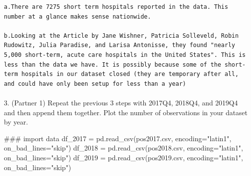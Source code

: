 \documentclass[
  letterpaper,
  DIV=11,
  numbers=noendperiod]{scrartcl}
\makeatletter
\let\oldparagraph\paragraph
\renewcommand{\paragraph}{
    \@ifstar
      \xxxParagraphStar
      \xxxParagraphNoStar
  }
\newcommand{\xxxParagraphStar}[1]{\oldparagraph*{#1}\mbox{}}
\newcommand{\xxxParagraphNoStar}[1]{\oldparagraph{#1}\mbox{}}
\newenvironment{Shaded}{\begin{snugshade}}{\end{snugshade}}
\newcommand{\CommentTok}[1]{\textcolor[rgb]{0.37,0.37,0.37}{#1}}
\newcommand{\NormalTok}[1]{\textcolor[rgb]{0.00,0.23,0.31}{#1}}
\newcommand{\OperatorTok}[1]{\textcolor[rgb]{0.37,0.37,0.37}{#1}}
\newcommand{\StringTok}[1]{\textcolor[rgb]{0.13,0.47,0.30}{#1}}
\makeatother
\begin{document}
\begin{verbatim}
a.There are 7275 short term hospitals reported in the data. This number at a glance makes sense nationwide.

b.Looking at the Article by Jane Wishner, Patricia Solleveld, Robin Rudowitz, Julia Paradise, and Larisa Antonisse, they found "nearly 5,000 short-term, acute care hospitals in the United States". This is less than the data we have. It is possibly because some of the short-term hospitals in our dataset closed (they are temporary after all, and could have only been setup for less than a year)
\end{verbatim}

\paragraph{3. (Partner 1) Repeat the previous 3 steps with 2017Q4,
2018Q4, and 2019Q4 and then append them together. Plot the number of
observations in your dataset by
year.}\label{partner-1-repeat-the-previous-3-steps-with-2017q4-2018q4-and-2019q4-and-then-append-them-together.-plot-the-number-of-observations-in-your-dataset-by-year.}

\begin{Shaded}
\begin{Highlighting}[]
\CommentTok{\#\#\# import data }
\NormalTok{df\_2017 }\OperatorTok{=}\NormalTok{ pd.read\_csv(}\StringTok{\textquotesingle{}pos2017.csv\textquotesingle{}}\NormalTok{, encoding}\OperatorTok{=}\StringTok{"latin1"}\NormalTok{, on\_bad\_lines}\OperatorTok{=}\StringTok{"skip"}\NormalTok{)}
\NormalTok{df\_2018 }\OperatorTok{=}\NormalTok{ pd.read\_csv(}\StringTok{\textquotesingle{}pos2018.csv\textquotesingle{}}\NormalTok{, encoding}\OperatorTok{=}\StringTok{"latin1"}\NormalTok{, on\_bad\_lines}\OperatorTok{=}\StringTok{"skip"}\NormalTok{)}
\NormalTok{df\_2019 }\OperatorTok{=}\NormalTok{ pd.read\_csv(}\StringTok{\textquotesingle{}pos2019.csv\textquotesingle{}}\NormalTok{, encoding}\OperatorTok{=}\StringTok{"latin1"}\NormalTok{, on\_bad\_lines}\OperatorTok{=}\StringTok{"skip"}\NormalTok{)}
\end{Highlighting}
\end{Shaded}
\end{document}
